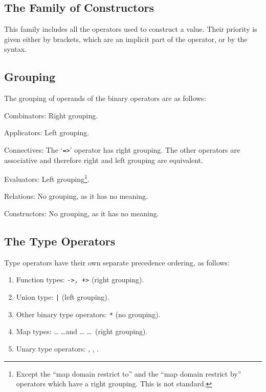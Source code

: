 \documentclass[\pformat,12pt]{article}
\newcommand{\nonstandard}[1]{%
}
\begin{document}
\subsection{The Family of Constructors}

This family includes all the operators used to construct a value.  Their
priority is given either by brackets, which are an implicit part of the
operator, or by the syntax.

\subsection{Grouping}\label{grouping}

The grouping of operands of the binary operators are as follows:

\begin{list}{\bf no label!}{%
    \def\mylabel#1{\hspace\labelsep #1\hfill}
    \let\makelabel\mylabel
    \settowidth{\labelwidth}{Constructors: }
    \setlength{\leftmargin}{\labelwidth}
    \addtolength{\leftmargin}{2\labelsep}
    }
\item[Combinators:] Right grouping.

\item[Applicators:] Left grouping.

\item[Connectives:] The `{\tt =>}' operator has right grouping.  The other
  operators are associative and therefore right and left grouping are
  equivalent.
  
\item[Evaluators:] Left grouping\footnote{Except the ``map domain restrict
    to'' and the ``map domain restrict by'' operators which have a right
    grouping. This is not standard.}.

\item[Relations:] No grouping, as it has no meaning.

\item[Constructors:] No grouping, as it has no meaning.
\end{list}

\subsection{The Type Operators}\label{preceedence}

Type operators have their own separate precedence ordering, as follows:
\begin{enumerate}
\item Function types: {\tt ->, +>} (right grouping).

\item Union type: {\tt |} (left grouping).

\item Other binary type operators: \verb+*+ (no grouping).

\item Map types:  \ldots {} \ldots and  \ldots
   \ldots\ (right grouping).\nonstandard{0}

\item Unary type operators: , , .
\end{enumerate}
\end{document}
